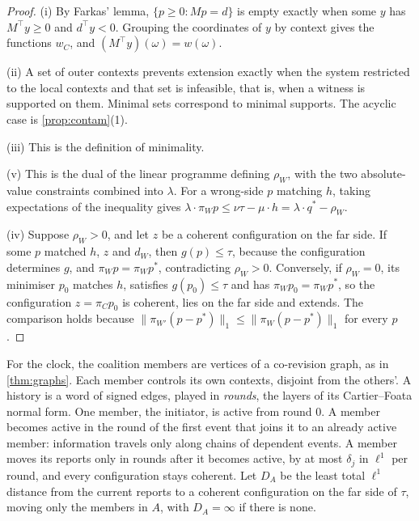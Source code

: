 \documentclass[11pt]{article}
\theoremstyle{definition}\newtheorem{definition}[theorem]{Definition}\newtheorem{remark}[theorem]{Remark}\newtheorem{example}[theorem]{Example}\newtheorem{problem}[theorem]{Open problem}\crefname{problem}{Problem}{Problems}
\begin{document}
\begin{proof}
(i) By Farkas' lemma, $\{p\ge0: Mp=d\}$ is empty exactly when some $y$ has $M^\top y\ge0$ and $d^\top y<0$. Grouping the coordinates of $y$ by context gives the functions $w_C$, and $(M^\top y)(\omega)=w(\omega)$.

(ii) A set of outer contexts prevents extension exactly when the system restricted to the local contexts and that set is infeasible, that is, when a witness is supported on them. Minimal sets correspond to minimal supports. The acyclic case is \cref{prop:contam}(1).

(iii) This is the definition of minimality.

(v) This is the dual of the linear programme defining $\rho_W$, with the two absolute-value constraints combined into $\lambda$. For a wrong-side $p$ matching $h$, taking expectations of the inequality gives $\lambda\cdot\pi_Wp\le\nu\tau-\mu\cdot h=\lambda\cdot q^\ast-\rho_W$.

(iv) Suppose $\rho_W>0$, and let $z$ be a coherent configuration on the far side. If some $p$ matched $h$, $z$ and $d_W$, then $g(p)\le\tau$, because the configuration determines $g$, and $\pi_Wp=\pi_Wp^\ast$, contradicting $\rho_W>0$. Conversely, if $\rho_W=0$, its minimiser $p_0$ matches $h$, satisfies $g(p_0)\le\tau$ and has $\pi_Wp_0=\pi_Wp^\ast$, so the configuration $z=\pi_Cp_0$ is coherent, lies on the far side and extends. The comparison holds because $\|\pi_{W'}(p-p^\ast)\|_1\le\|\pi_W(p-p^\ast)\|_1$ for every $p$.
\end{proof}

For the clock, the coalition members are vertices of a co-revision graph, as in \cref{thm:graphs}. Each member controls its own contexts, disjoint from the others'. A history is a word of signed edges, played in \emph{rounds}, the layers of its Cartier--Foata normal form. One member, the initiator, is active from round $0$. A member becomes active in the round of the first event that joins it to an already active member: information travels only along chains of dependent events. A member moves its reports only in rounds after it becomes active, by at most $\delta_j$ in $\ell^1$ per round, and every configuration stays coherent. Let $D_A$ be the least total $\ell^1$ distance from the current reports to a coherent configuration on the far side of $\tau$, moving only the members in $A$, with $D_A=\infty$ if there is none.
\end{document}
